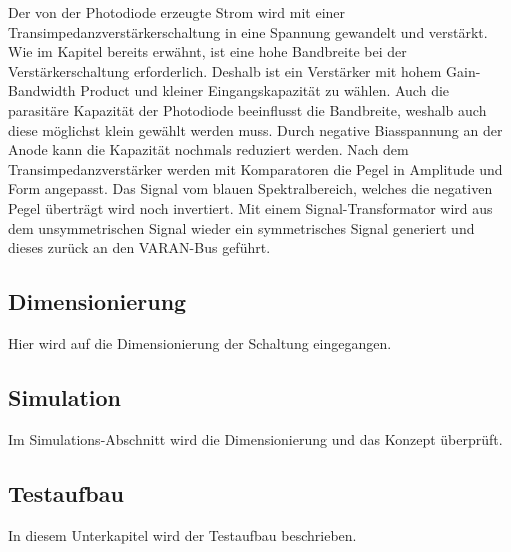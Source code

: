 Der von der Photodiode erzeugte Strom wird mit einer Transimpedanzverstärkerschaltung in eine Spannung gewandelt und verstärkt. Wie im Kapitel  bereits erwähnt, ist eine hohe Bandbreite bei der Verstärkerschaltung erforderlich. Deshalb ist ein Verstärker mit hohem Gain-Bandwidth Product und kleiner Eingangskapazität zu wählen. Auch die parasitäre Kapazität der Photodiode beeinflusst die Bandbreite, weshalb auch diese möglichst klein gewählt werden muss. Durch negative Biasspannung an der Anode kann die Kapazität nochmals reduziert werden.
\newline
Nach dem Transimpedanzverstärker werden mit Komparatoren die Pegel in Amplitude und Form angepasst. Das Signal vom blauen Spektralbereich, welches die negativen Pegel überträgt wird noch invertiert. Mit einem Signal-Transformator wird aus dem unsymmetrischen Signal wieder ein symmetrisches Signal generiert und dieses zurück an den VARAN-Bus geführt.
\subsection{Dimensionierung}
Hier wird auf die Dimensionierung der Schaltung eingegangen.
\subsection{Simulation}
Im Simulations-Abschnitt wird die Dimensionierung und das Konzept überprüft.
\subsection{Testaufbau}
In diesem Unterkapitel wird der Testaufbau beschrieben.